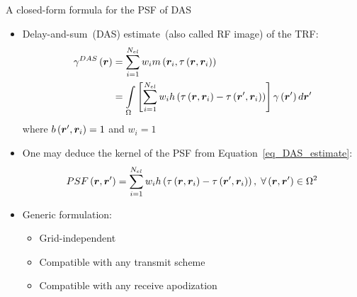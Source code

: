 {\begin{block}{A closed-form formula for the PSF of DAS}
	\begin{itemize}
		\item Delay-and-sum~(DAS) estimate~(also called RF image) of the TRF:
		\begin{align}
		\label{eq_DAS_estimate}
			\gamma^{DAS} \left(\bm{r}\right) &= \sum \limits_{i=1}^{N_{el}} w_i m \left(\bm{r}_i, \tau \left(\bm{r}, \bm{r}_i\right)\right) \nonumber \\
			&= \int \limits_{\Omega} \left[\sum \limits_{i=1}^{N_{el}} w_i h \left(\tau \left(\bm{r}, \bm{r}_i\right) - \tau \left(\bm{r}', \bm{r}_i\right) \right)\right] \gamma\left(\bm{r}'\right) d \bm{r}'
		\end{align}
		where $b \left(\bm{r}', \bm{r}_i\right) = 1$ and $w_i=1$
		\item One may deduce the kernel of the PSF from Equation~\eqref{eq_DAS_estimate}:
		\begin{equation}
			\label{eq_PSF_estimate}
			PSF \left(\bm{r}, \bm{r}'\right) = \sum \limits_{i=1}^{N_{el}} w_i h \left(\tau \left(\bm{r}, \bm{r}_i\right) - \tau \left(\bm{r}', \bm{r}_i\right) \right), \; \forall \left(\bm{r}, \bm{r}'\right) \in \Omega^2
		\end{equation}
		\item Generic formulation:
		\begin{itemize}
			\item Grid-independent
			\item Compatible with any transmit scheme
			\item Compatible with any receive apodization 
		\end{itemize}
	\end{itemize}
\end{block}
\vfill


}
